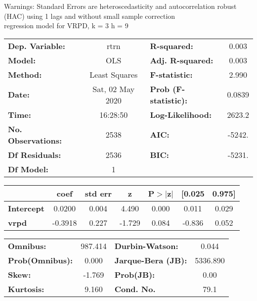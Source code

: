 Warnings: \newline
 [1] Standard Errors are heteroscedasticity and autocorrelation robust (HAC) using 1 lags and without small sample correction\\ 

regression model for VRPD, k = 3 h = 9\begin{center}
\begin{tabular}{lclc}
\toprule
\textbf{Dep. Variable:}    &       rtrn       & \textbf{  R-squared:         } &     0.003   \\
\textbf{Model:}            &       OLS        & \textbf{  Adj. R-squared:    } &     0.003   \\
\textbf{Method:}           &  Least Squares   & \textbf{  F-statistic:       } &     2.990   \\
\textbf{Date:}             & Sat, 02 May 2020 & \textbf{  Prob (F-statistic):} &   0.0839    \\
\textbf{Time:}             &     16:28:50     & \textbf{  Log-Likelihood:    } &    2623.2   \\
\textbf{No. Observations:} &        2538      & \textbf{  AIC:               } &    -5242.   \\
\textbf{Df Residuals:}     &        2536      & \textbf{  BIC:               } &    -5231.   \\
\textbf{Df Model:}         &           1      & \textbf{                     } &             \\
\bottomrule
\end{tabular}
\begin{tabular}{lcccccc}
                   & \textbf{coef} & \textbf{std err} & \textbf{z} & \textbf{P$> |$z$|$} & \textbf{[0.025} & \textbf{0.975]}  \\
\midrule
\textbf{Intercept} &       0.0200  &        0.004     &     4.490  &         0.000        &        0.011    &        0.029     \\
\textbf{vrpd}      &      -0.3918  &        0.227     &    -1.729  &         0.084        &       -0.836    &        0.052     \\
\bottomrule
\end{tabular}
\begin{tabular}{lclc}
\textbf{Omnibus:}       & 987.414 & \textbf{  Durbin-Watson:     } &    0.044  \\
\textbf{Prob(Omnibus):} &   0.000 & \textbf{  Jarque-Bera (JB):  } & 5336.890  \\
\textbf{Skew:}          &  -1.769 & \textbf{  Prob(JB):          } &     0.00  \\
\textbf{Kurtosis:}      &   9.160 & \textbf{  Cond. No.          } &     79.1  \\
\bottomrule
\end{tabular}
\end{center}

